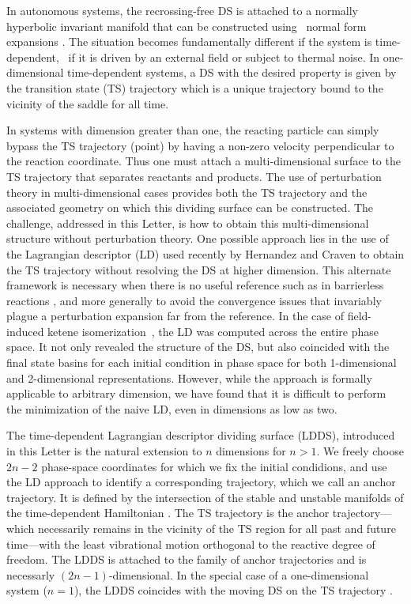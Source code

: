\documentclass{elsarticle}
\def\EDITS#1{{\color{green}#1}}
\def\EDITS#1{#1}
\def\EDITS#1{{\color{mygreen}#1}}
\begin{document}
In autonomous systems, the recrossing-free DS 
is \EDITS{attached to} a normally hyperbolic invariant manifold  
that can be constructed using \eg~normal form 
expansions \cite{pollak78,pech79a,hern93b,hern94,Uzer02,Jaffe02,Teramoto11,Li06prl,Waalkens04b,Waalkens13}.
% 
The situation becomes fundamentally different if the system is time-dependent, 
\eg~if it is driven by an external field or subject to thermal noise.
In one-dimensional time-dependent systems, a DS with the 
desired property is given by the transition state (TS) trajectory
\cite{dawn05a,dawn05b,hern06d,Kawai2009a,hern14b,hern14f,hern15a,hern16a, 
hern16h, hern16i}
which is a unique trajectory bound to the 
\EDITS{vicinity of the}
saddle for all time.

In systems with dimension greater than one,
the reacting 
particle can simply bypass the TS trajectory (point) 
by having a non-zero velocity perpendicular to 
the reaction coordinate.
Thus one must attach a multi-dimensional surface to
the TS trajectory that separates reactants and products.
The use of perturbation theory in multi-dimensional cases
provides both the TS trajectory and the associated geometry 
on which this dividing surface can be constructed.
The challenge, addressed in this Letter,
is how to obtain 
this multi-dimensional structure without perturbation theory.
One possible approach lies in the use of
the Lagrangian descriptor (LD) \cite{Mancho2010,Mancho2013}
used recently by Hernandez and Craven \cite{hern15e,hern16d}
to obtain the TS trajectory 
without resolving the DS at higher dimension.
This alternate framework is necessary when there is no useful reference 
such as in 
barrierless reactions \cite{hern16a},
and more generally to avoid the convergence
issues that invariably plague a perturbation expansion far from the reference.
In the case of field-induced ketene isomerization~\cite{hern16d},
the LD was computed across the entire phase space.
It not only revealed the structure of the DS, but also coincided with the
final state basins for each initial condition in phase space for
both 1-dimensional and 2-dimensional representations.
However, while the approach is formally applicable 
to arbitrary dimension, we have found that it is difficult
to perform the minimization of the 
naive LD, even in dimensions as low as two.

The time-dependent 
Lagrangian descriptor dividing surface (LDDS),
introduced in this Letter
is the natural extension to 
\EDITS{$n$ dimensions for $n>1$.}
\EDITS{We freely choose $2n-2$ phase-space coordinates
for which we fix the initial condidions, and use the LD approach
to identify a corresponding trajectory, which we call an anchor
trajectory.}
It is defined by the intersection of the stable and unstable manifolds
of the time-dependent 
Hamiltonian \cite{Lichtenberg82, Ott2002a}.
\EDITS{The TS trajectory is the anchor trajectory---which 
necessarily remains in the vicinity of the TS region for all past and
future time---with the least vibrational motion orthogonal to the reactive
degree of freedom.}
\EDITS{The LDDS is attached to 
the family of anchor trajectories and is
necessarly $(2n-1)$-dimensional.}
In the special case of a one-dimensional system ($n=1$),
the LDDS coincides with the 
\EDITS{moving DS on the} TS trajectory \cite{hern15e}.
\end{document}
